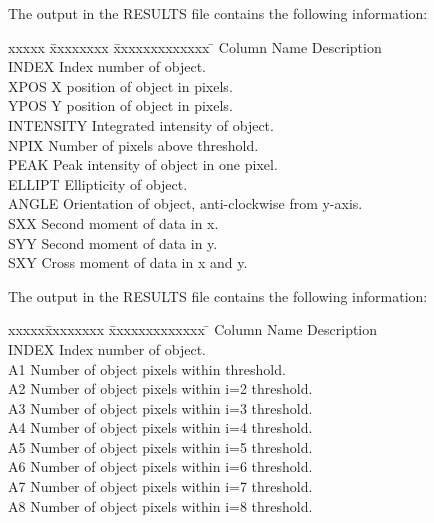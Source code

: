 \begin{small}
{{{         \sstitem
         The output in the RESULTS file contains the following
         information:
\begin{tabbing}
xxxxx \= xxxxxxxx \= xxxxxxxxxxxxx \= \kill
\> Column \> Name  \> Description \\
 \> INDEX \> Index number of object.\\
 \> XPOS \> X position of object in pixels.\\
 \> YPOS \> Y position of object in pixels.\\
 \> INTENSITY \> Integrated intensity of object.\\
 \> NPIX \> Number of pixels above threshold.\\
 \> PEAK \> Peak intensity of object in one pixel.\\
 \> ELLIPT \> Ellipticity of object.\\
 \> ANGLE \> Orientation of object, anti-clockwise from y-axis.\\
 \> SXX \> Second moment of data in x.\\
 \> SYY \> Second moment of data in y.\\
 \> SXY \> Cross moment of data in x and y.\\
\end{tabbing}

         \sstitem
         The output in the RESULTS file contains the following
         information:
\begin{tabbing}
xxxxx\=xxxxxxxx \= xxxxxxxxxxxxx \= \kill
\>Column \> Name  \> Description \\
 \> INDEX \> Index number of object.\\
 \> A1 \> Number of object pixels within threshold.\\
 \> A2 \> Number of object pixels within i=2 threshold.\\
 \> A3 \> Number of object pixels within i=3 threshold.\\
 \> A4 \> Number of object pixels within i=4 threshold.\\
 \> A5 \> Number of object pixels within i=5 threshold.\\
 \> A6 \> Number of object pixels within i=6 threshold.\\
 \> A7 \> Number of object pixels within i=7 threshold.\\
 \> A8 \> Number of object pixels within i=8 threshold.\\
\end{tabbing}

}}}
\end{small}
